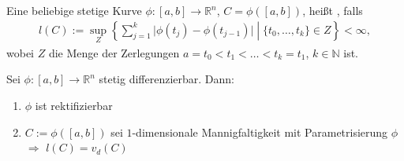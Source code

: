 \begin{*definition}
	Eine beliebige stetige Kurve $\phi\colon [a,b]\to\mathbb{R}^n$, $C= \phi([a,b])$, heißt , falls \begin{align*}
		l(C) := \sup\limits_{Z} \left\lbrace \left. \sum_{j=1}^k \vert \phi(t_j) - \phi(t_{j-1})\vert\;\right|\; \{ t_0,\dotsc, t_k\} \in Z\right\rbrace < \infty,
	\end{align*}
	wobei $Z$ die Menge der Zerlegungen $a = t_0 < t_1 < \dotsc < t_k = t_1$, $k\in\mathbb{N}$ ist.
\end{*definition}

\begin{proposition}
	Sei $\phi\colon [a,b]\to \mathbb{R}^n$ stetig differenzierbar. Dann: \begin{enumerate}[label={\arabic*)}]
		\item $\phi$ ist rektifizierbar
		\item $C:= \phi([a,b])$ sei $1$-dimensionale Mannigfaltigkeit mit Parametrisierung $\phi$ \\
		\hspace*{0.5em} $\Rightarrow$ $l(C) = v_d(C)$
	\end{enumerate}
\end{proposition}


